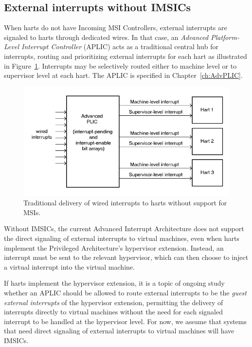 \subsection{External interrupts without IMSICs}

When {\RISCV} harts do not have Incoming MSI Controllers, external
interrupts are signaled to harts through dedicated wires.
In that case, an \emph{Advanced Platform-Level Interrupt Controller}
(APLIC) acts as a traditional central hub for interrupts,
routing and prioritizing external interrupts for each hart as
illustrated in Figure~\ref{fig:intrsWithoutIMSICs}.
Interrupts may be selectively routed either to machine level or to
supervisor level at each hart.
The APLIC is specified in Chapter~\ref{ch:AdvPLIC}.

\begin{figure}[th]
\centerline{\includegraphics[scale=0.55]{intrsWithoutIMSICs.png}}
\caption{%
Traditional delivery of wired interrupts to harts without support for
MSIs.%
}
\label{fig:intrsWithoutIMSICs}
\end{figure}

Without IMSICs, the current Advanced Interrupt Architecture does
not support the direct signaling of external interrupts to virtual
machines, even when {\RISCV} harts implement the Privileged
Architecture's hypervisor extension.
Instead, an interrupt must be sent to the relevant hypervisor, which
can then choose to inject a virtual interrupt into the virtual machine.

\begin{commentary}
If harts implement the hypervisor extension, it is a topic of ongoing
study whether an APLIC should be allowed to route external
interrupts to be the \emph{guest external interrupts} of the hypervisor
extension, permitting the delivery of interrupts directly to virtual
machines without the need for each signaled interrupt to be handled at
the hypervisor level.
For now, we assume that systems that need direct signaling of external
interrupts to virtual machines will have IMSICs.
\end{commentary}

